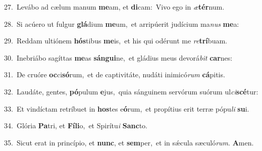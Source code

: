 {\numbfont\textcolor{\numbcolor}{27.}}~Levábo ad cælum manum \textbf{me}\-am, et \textbf{di}\-cam:~\star Vivo ego in \textit{æ}\-\textbf{tér}num.\par
{\numbfont\textcolor{\numbcolor}{28.}}~Si acúero ut fulgur \textbf{glá}\-dium \textbf{me}\-um,~\star et arripúerit judícium ma\textit{nus} \textbf{me}\-a:\par
{\numbfont\textcolor{\numbcolor}{29.}}~Reddam ultiónem \textbf{hós}\-tibus \textbf{me}\-is,~\star et his qui odérunt me \textit{re}\-\textbf{trí}buam.\par
{\numbfont\textcolor{\numbcolor}{30.}}~Inebriábo sagíttas \textbf{me}\-as \textbf{sán}\-\textbf{gui}ne,~\star et gládius meus devorá\textit{bit} \textbf{car}\-nes:\par
{\numbfont\textcolor{\numbcolor}{31.}}~De cruóre \textbf{oc}\-ci\-\textbf{só}\-rum,~\star et de captivitáte, nudáti inimicó\textit{rum} \textbf{cá}\-pitis.\par
{\numbfont\textcolor{\numbcolor}{32.}}~Laudáte, gentes, \textbf{pó}\-pulum \textbf{e}\-jus,~\star quia sánguinem servórum suórum ul\-\textit{ci}\-\textbf{scé}tur:\par
{\numbfont\textcolor{\numbcolor}{33.}}~Et vindíctam retríbuet in \textbf{hos}\-tes e\-\textbf{ó}\-rum,~\star et propítius erit terræ pópu\textit{li} \textbf{su}\-i.\par
{\numbfont\textcolor{\numbcolor}{34.}}~Glória \textbf{Pa}\-tri, et \textbf{Fí}\-\textbf{li}o,~\star et Spirítu\textit{i} \textbf{Sanc}\-to.\par
{\numbfont\textcolor{\numbcolor}{35.}}~Sicut erat in princípio, et \textbf{nunc}\-, et \textbf{sem}\-per,~\star et in sǽcula sæculó\-\textit{rum}\-. \textbf{A}\-men.\par
